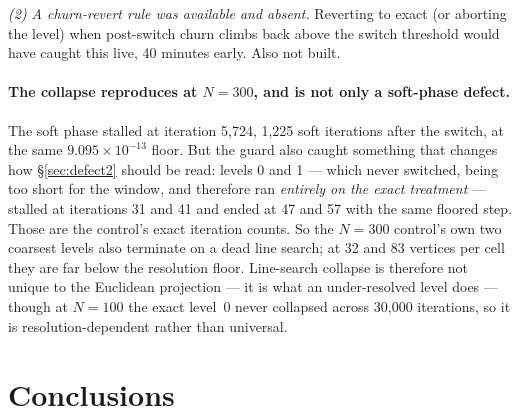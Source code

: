 \documentclass[11pt,a4paper]{article}
\begin{document}
\emph{(2) A churn-revert rule was available and absent.} Reverting to exact (or
aborting the level) when post-switch churn climbs back above the switch
threshold would have caught this live, 40 minutes early. Also not built.

\paragraph{The collapse reproduces at \(N{=}300\), and is not only a soft-phase
defect.} The soft phase stalled at iteration 5{,}724, 1{,}225 soft iterations
after the switch, at the same \(9.095\times10^{-13}\) floor. But the guard also
caught something that changes how \S\ref{sec:defect2} should be read: levels 0
and 1 --- which never switched, being too short for the window, and therefore ran
\emph{entirely on the exact treatment} --- stalled at iterations 31 and 41 and
ended at 47 and 57 with the same floored step. Those are the control's exact
iteration counts. So the \(N{=}300\) control's own two coarsest levels also
terminate on a dead line search; at 32 and 83 vertices per cell they are far
below the resolution floor. Line-search collapse is therefore not unique to the
Euclidean projection --- it is what an under-resolved level does --- though at
\(N{=}100\) the exact level~0 never collapsed across 30{,}000 iterations, so it
is resolution-dependent rather than universal.

\section{Conclusions}
\label{sec:conclusions}
\end{document}
